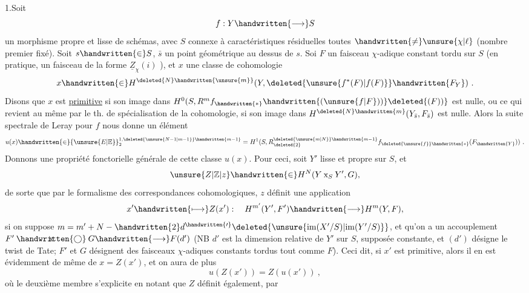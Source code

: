 
1.\quad Soit
\[
f:Y\handwritten{\longrightarrow}S
\]
un morphisme propre et lisse de schémas, avec $S$  connexe à caractéristiques résiduelles toutes $\handwritten{\ne}\unsure{\chi|\ell}$ (nombre premier fixé). Soit $s\handwritten{\in}S$, $\bar s$ un point géométrique au dessus de $s$. Soi $F$ un faisceau $\chi$-adique constant tordu sur $S$ (en pratique, un faisceau de la forme $\underline{Z}_{\chi}(i)$ ), et $x$ une classe de cohomologie
\[
x\handwritten{\in}H^{\deleted{N}\handwritten{\unsure{m}}}(Y,\deleted{\unsure{f^*(F)|f(F)}}\handwritten{F_Y})\ .
\]
Disons que $x$ est \uline{primitive} si son image dans $H^0(S,R^m f_{\handwritten{*}}\handwritten{(\unsure{f|F}))}\deleted{(F))}$ est nulle, ou ce qui revient au même par le th. de spécialisation de la cohomologie, si son image dans $H^{\deleted{N}\handwritten{m}}(Y_{\bar s},F_{\bar s})$ est nulle. Alors la suite spectrale de Leray pour $f$ nous donne un élément
\[
u(x)\handwritten{\in}{\unsure{E|\mathbb{E}}}_2^{1,\deleted{\unsure{N-1|m-1}}\handwritten{m-1}}=H^1(S,R^{\deleted{\unsure{m|N}}\handwritten{m-1}}_{\deleted{2}}f_{\deleted{\unsure{f}}\handwritten{*}}(F_{\handwritten{Y}}))\ .
\]
Donnons une propriété fonctorielle générale de cette classe $u(x)$. Pour ceci, soit $Y'$ lisse et propre sur $S$, et
\[
\unsure{Z|\mathbb{Z}|z}\handwritten{\in}H^N(Y\mathbin{\mathrm{x}}_S Y',G),
\]
de sorte que par le formalisme des correspondances cohomologiques, $z$ définit une application
\[
x'\handwritten{\longmapsto}Z(x'): \quad H^{m'}(Y',F')\handwritten{\longrightarrow}H^m(Y,F),
\]
si on suppose $m=m'+N-\handwritten{2}d^{\handwritten{\prime}}\deleted{\unsure{\mathrm{im}(X'/S)|\mathrm{im}(Y'/S)}}$, et qu'on a un accouplement $F'\mathbin{\ooalign{\hfil$\mathrm{x}$\hfil\cr\hfil$\handwritten{\bigcirc}$\hfil\cr}}G\handwritten{\longrightarrow}F(d')$ (NB $d'$ est la dimension relative de $Y'$ sur $S$, supposée constante, et $(d')$ désigne le twist de Tate; $F'$ et $G$ désignent des faisceaux $\chi$-adiques constants tordus  tout comme $F$). Ceci dit, si $x'$ est primitive, alors il en est évidemment de même de $x=Z(x')$, et on aura de plus
\[
u(Z(x'))=Z(u(x'))\ ,
\]
où le deuxième membre s'explicite en notant que $Z$ définit également, par
